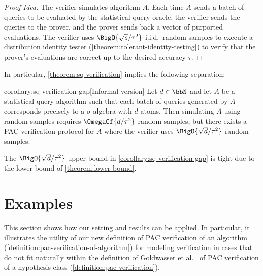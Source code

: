\documentclass{toc}
\begin{document}
\begin{proof}[Proof Idea]
	The verifier simulates algorithm $A$. Each time $A$ sends a batch of queries to be evaluated by the statistical query oracle, the verifier sends the queries to the prover, and the prover sends back a vector of purported evaluations. The verifier uses $\BigO{\sqrt{s}/\tau^2}$ i.i.d.\ random samples to execute a distribution identity tester (\cref{theorem:tolerant-identity-testing}) to verify that the prover's evaluations are correct up to the desired accuracy $\tau$.
\end{proof}

In particular, \cref{theorem:sq-verification} implies the following separation:

\begin{repcorollary}{corollary:sq-verification-gap}[Informal version]
	Let $d \in \bbN$ and let $A$ be a statistical query algorithm such that each batch of queries generated by $A$ corresponds precisely to a $\sigma$-algebra with $d$ atoms. Then simulating $A$ using random samples requires $\OmegaOf{d/\tau^2}$ random samples, but there exists a PAC verification protocol for $A$ where the verifier uses $\BigO{\sqrt{d}/\tau^2}$ random samples.
\end{repcorollary}

The $\BigO{\sqrt{d}/\tau^2}$ upper bound in \cref{corollary:sq-verification-gap} is tight due to the lower bound of \cref{theorem:lower-bound}.


\section{Examples}

This section shows how our setting and results can be applied. In particular, it illustrates the utility of our new definition of PAC verification of an algorithm (\cref{definition:pac-verification-of-algorithm}) for modeling verification in cases that do not fit naturally within the definition of Goldwasser et al.\ \cite{GoldwasserRSY21} of PAC verification of a hypothesis class (\cref{definition:pac-verification}).
\end{document}
